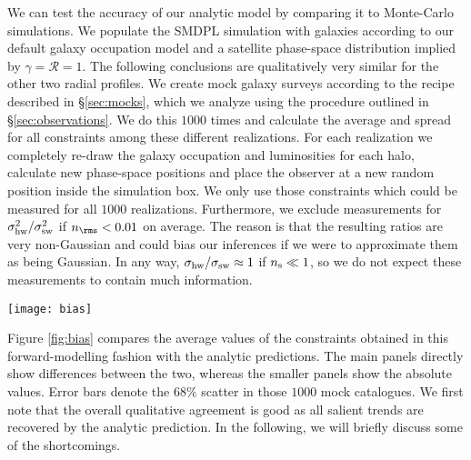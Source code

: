 \documentclass[fleqn,usenatbib,useAMS]{mnras}
\begin{document}
	We can test the accuracy of our analytic model by comparing it to Monte-Carlo simulations. We populate the SMDPL simulation with galaxies according to our default galaxy occupation model and a satellite phase-space distribution implied by $\gamma = \mathcal{R} = 1$. The following conclusions are qualitatively very similar for the other two radial profiles. We create mock galaxy surveys according to the recipe described in \S\ref{sec:mocks}, which we analyze using the procedure outlined in \S\ref{sec:observations}. We do this $1000$ times and calculate the average and spread for all constraints among these different realizations. For each realization we completely re-draw the galaxy occupation and luminosities for each halo, calculate new phase-space positions and place the observer at a new random position inside the simulation box. We only use those constraints which could be measured for all $1000$ realizations. Furthermore, we exclude measurements for $\sigma_{\rm hw}^2 / \sigma_{\rm sw}^2$ if $n_\rms < 0.01$ on average. The reason is that the resulting ratios are very non-Gaussian and could bias our inferences if we were to approximate them as being Gaussian. In any way, $\sigma_{\rm hw} / \sigma_{\rm sw} \approx 1$ if $n_{\rm s} \ll 1$, so we do not expect these measurements to contain much information.
	\begin{figure*}
		\centering
		\texttt{[image: bias]}
		\caption{Comparison of the different constraints derived from direct forward modelling and our simple analytical model. The main panels directly highlight differences between the two. Error bars show the $1 \sigma$ spread observed in $1000$ mock catalogues. The satellite observables in the lower row have been measured for red and blue primaries separately, as indicated by the colour of the error bars. In all cases, the dashed line indicates perfect agreement between the analytic model and the full forward-modelling approach. Finally, each smaller panel shows the absolute values of those observables for the analytic model (solid) and the forward-modelling result (dashed).}
		\label{fig:bias}
	\end{figure*}
	
	Figure \ref{fig:bias} compares the average values of the constraints obtained in this forward-modelling fashion with the analytic predictions. The main panels directly show differences between the two, whereas the smaller panels show the absolute values. Error bars denote the $68\%$ scatter in those $1000$ mock catalogues. We first note that the overall qualitative agreement is good as all salient trends are recovered by the analytic prediction. In the following, we will briefly discuss some of the shortcomings.
	
\end{document}
